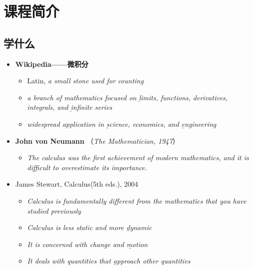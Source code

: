 \section{课程简介}

\subsection{学什么}

	\begin{itemize}
		  \item {\bf Wikipedia——微积分} 
		\begin{itemize}
		  \item Latin, {\it a small stone used for counting}  
		  \item {\it a branch of mathematics focused on {\b limits, functions,
		  	derivatives, integrals,}  and {\b infinite series}} 
	  	  \item {\it widespread application in {\b science, economics,} and {\b
	  	  engineering}} 
		\end{itemize}
		\item {\bf John von Neumann} （{\small\it The Mathematician, 1947}）
		\begin{itemize}
		  \item {\it The calculus was the first achievement of modern
		  mathematics, and it is difficult to overestimate its importance.}
		\end{itemize}
		  \item James Stewart, Calculus(5th eds.), 2004
		  \begin{itemize}
		    \item {\it Calculus is fundamentally different from the mathematics that
		    you have studied previously}
		    \item {\it Calculus is less static and more {\b dynamic}}
		    \item {\it It is concerned with change and {\b motion}}
		    \item {\it It deals with quantities that {\b approach} other
		    quantities}%
		  \end{itemize}
		\end{itemize}

